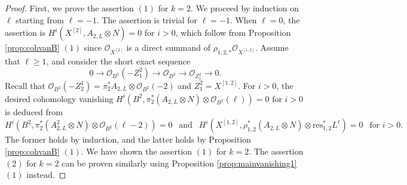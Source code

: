 \documentclass{amsart}
\theoremstyle{plain}
\theoremstyle{definition}
\theoremstyle{remark}
\newcommand{\res}{\textrm{res}}
\begin{document}
\begin{proof}
First, we prove the assertion $(1)$ for $k=2$. We proceed by induction on $\ell$ starting from $\ell = -1$. The assertion is trivial for $\ell=-1$. When $\ell=0$, the assertion is $H^i(X^{[2]}, A_{2,L} \otimes N)=0$ for $i>0$, which follow from Proposition \ref{prop:cohvanB} $(1)$ since $\mathcal{O}_{X^{[2]}}$ is a direct summand of $\rho_{1,2,*} \mathcal{O}_{X^{[1,2]}}$. Assume that $\ell \geq 1$, and consider the short exact sequence
$$
0 \longrightarrow \mathcal{O}_{B^2}(-Z_1^2) \longrightarrow \mathcal{O}_{B^2} \longrightarrow \mathcal{O}_{Z_1^2} \longrightarrow 0. 
$$
Recall that $\mathcal{O}_{B^2}(-Z_2^1) = \pi_2^* A_{2,L} \otimes \mathcal{O}_{B^2}(-2)$ and $Z_1^2 = X^{[1,2]}$. For $i>0$, the desired cohomology vanishing $H^i(B^2,  \pi_2^* (A_{2,L} \otimes N) \otimes \mathcal{O}_{B^2}(\ell))=0$ for $i>0$ is deduced from 
$$
H^i(B^2,  \pi_2^* (A_{2,L}^2 \otimes N) \otimes \mathcal{O}_{B^2}(\ell-2))=0~~\text{ and }~~H^i(X^{[1,2]}, \rho_{1,2}^* (A_{2,L} \otimes N) \otimes \res_{1,2}^* L^{\ell})=0~~\text{ for $i>0$}.
$$
The former holds by induction, and the latter holds by Proposition \ref{prop:cohvanB} $(1)$. We have shown the assertion $(1)$ for $k=2$. The assertion $(2)$ for $k=2$ can be proven similarly using Proposition \ref{prop:mainvanishing1} $(1)$ instead. 

\medskip


\end{proof}
\end{document}
